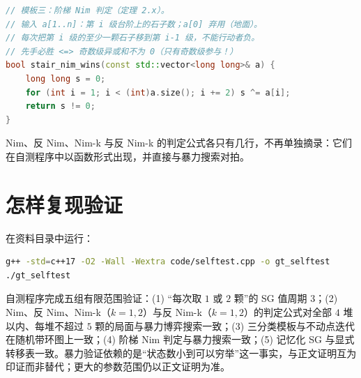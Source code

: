 \documentclass[UTF8,a4paper,11pt,oneside,openany,fontset=fandol]{ctexbook}
\theoremstyle{definition}
\begin{document}
\begin{lstlisting}[language=C++]
// 模板三：阶梯 Nim 判定（定理 2.x）。
// 输入 a[1..n]：第 i 级台阶上的石子数；a[0] 弃用（地面）。
// 每次把第 i 级的至少一颗石子移到第 i-1 级，不能行动者负。
// 先手必胜 <=> 奇数级异或和不为 0（只有奇数级参与！）
bool stair_nim_wins(const std::vector<long long>& a) {
    long long s = 0;
    for (int i = 1; i < (int)a.size(); i += 2) s ^= a[i];
    return s != 0;
}
\end{lstlisting}

Nim、反 Nim、Nim-k 与反 Nim-k 的判定公式各只有几行，不再单独摘录：它们在自测程序中以函数形式出现，并直接与暴力搜索对拍。

\section{怎样复现验证}
在资料目录中运行：
\begin{lstlisting}[language=bash]
g++ -std=c++17 -O2 -Wall -Wextra code/selftest.cpp -o gt_selftest
./gt_selftest
\end{lstlisting}
自测程序完成五组有限范围验证：(1) “每次取 $1$ 或 $2$ 颗”的 SG 值周期 $3$；(2) Nim、反 Nim、Nim-k（$k=1,2$）与反 Nim-k（$k=1,2$）的判定公式对全部 $4$ 堆以内、每堆不超过 $5$ 颗的局面与暴力博弈搜索一致；(3) 三分类模板与不动点迭代在随机带环图上一致；(4) 阶梯 Nim 判定与暴力搜索一致；(5) 记忆化 SG 与显式转移表一致。暴力验证依赖的是“状态数小到可以穷举”这一事实，与正文证明互为印证而非替代；更大的参数范围仍以正文证明为准。
\end{document}
